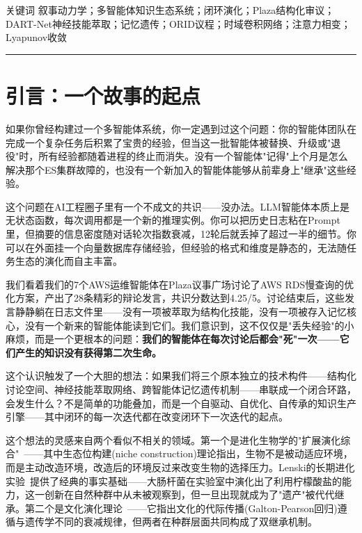 \documentclass[twocolumn,10.5pt]{ctexart}
\begin{document}
\vspace{6pt}
{\heiti 关键词 \quad}{\kaishu 叙事动力学；多智能体知识生态系统；闭环演化；Plaza结构化审议；DART-Net神经技能萃取；记忆遗传；ORID议程；时域卷积网络；注意力相变；Lyapunov收敛}

\vspace{12pt}
\hrule
\vspace{12pt}

\section{引言：一个故事的起点}

如果你曾经构建过一个多智能体系统，你一定遇到过这个问题：你的智能体团队在完成一个复杂任务后积累了宝贵的经验，但当这一批智能体被替换、升级或"退役"时，所有经验都随着进程的终止而消失。没有一个智能体"记得"上个月是怎么解决那个ES集群故障的，也没有一个新加入的智能体能够从前辈身上"继承"这些经验。

这个问题在AI工程圈子里有一个不成文的共识——没办法。LLM智能体本质上是无状态函数，每次调用都是一个新的推理实例。你可以把历史日志粘在Prompt里，但摘要的信息密度随对话轮次指数衰减，12轮后就丢掉了超过一半的细节。你可以在外面挂一个向量数据库存储经验，但经验的格式和维度是静态的，无法随任务生态的演化而自主丰富。

我们看着我们的7个AWS运维智能体在Plaza议事广场讨论了AWS RDS慢查询的优化方案，产出了28条精彩的辩论发言，共识分数达到4.25/5。讨论结束后，这些发言静静躺在日志文件里——没有一项被萃取为结构化技能，没有一项被存入记忆核心，没有一个新来的智能体能读到它们。我们意识到，这不仅仅是"丢失经验"的小麻烦，而是一个更根本的问题：\textbf{我们的智能体在每次讨论后都会"死"一次——它们产生的知识没有获得第二次生命。}

这个认识触发了一个大胆的想法：如果我们将三个原本独立的技术构件——结构化讨论空间、神经技能萃取网络、跨智能体记忆遗传机制——串联成一个闭合环路，会发生什么？不是简单的功能叠加，而是一个自驱动、自优化、自传承的知识生产引擎——其中闭环的每一次迭代都在改变闭环下一次迭代的起点。

这个想法的灵感来自两个看似不相关的领域。第一个是进化生物学的"扩展演化综合"~\cite{laland2015extended,pigliucci2010extended}——其中生态位构建(niche construction)理论指出，生物不是被动适应环境，而是主动改造环境，改造后的环境反过来改变生物的选择压力。Lenski的长期进化实验~\cite{lenski2003evolutionary}提供了经典的事实基础——大肠杆菌在实验室中演化出了利用柠檬酸盐的能力，这一创新在自然种群中从未被观察到，但一旦出现就成为了"遗产"被代代继承。第二个是文化演化理论~\cite{boyd1985culture}——它指出文化的代际传播(Galton-Pearson回归)遵循与遗传学不同的衰减规律，但两者在种群层面共同构成了双继承机制。
\end{document}
